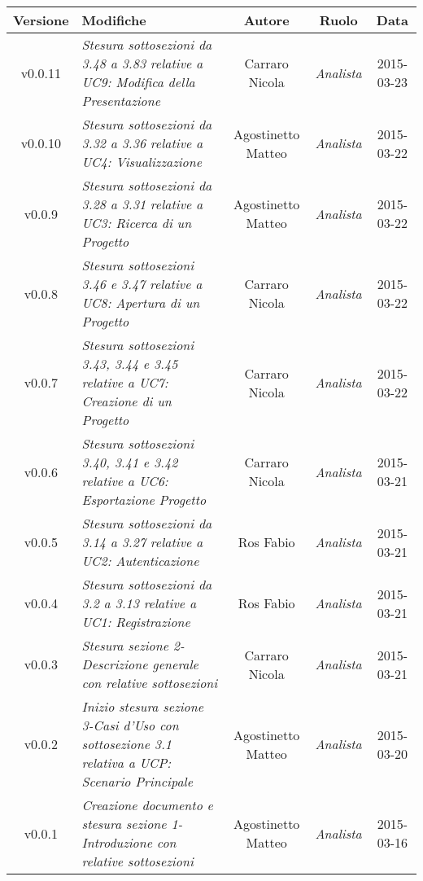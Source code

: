 \newpage
\begin{table}[h]
\centering
\begin{tabular}{|c|p{}|c|c|c|}
	\toprule
		\textbf{Versione} & \textbf{Modifiche} & \textbf{Autore} & \textbf{Ruolo} & \textbf{Data}\\
	\midrule
	\midrule
		v0.0.11 & \textit{Stesura sottosezioni da 3.48 a 3.83 relative a UC9: Modifica della Presentazione} & Carraro Nicola & \textit{Analista} & 2015-03-23\\
	\midrule
		v0.0.10 & \textit{Stesura sottosezioni da 3.32 a 3.36 relative a UC4: Visualizzazione} & Agostinetto Matteo & \textit{Analista} & 2015-03-22\\
	\midrule
		v0.0.9 & \textit{Stesura sottosezioni da 3.28 a 3.31 relative a UC3: Ricerca di un Progetto} & Agostinetto Matteo & \textit{Analista} & 2015-03-22\\
	\midrule
		v0.0.8 & \textit{Stesura sottosezioni 3.46 e 3.47 relative a UC8: Apertura di un Progetto} & Carraro Nicola & \textit{Analista} & 2015-03-22\\
	\midrule
		v0.0.7 & \textit{Stesura sottosezioni 3.43, 3.44 e 3.45 relative a UC7: Creazione di un Progetto} & Carraro Nicola & \textit{Analista} & 2015-03-22\\
	\midrule
		v0.0.6 & \textit{Stesura sottosezioni 3.40, 3.41 e 3.42 relative a UC6: Esportazione Progetto} & Carraro Nicola & \textit{Analista} & 2015-03-21\\
	\midrule
		v0.0.5 & \textit{Stesura sottosezioni da 3.14 a 3.27 relative a UC2: Autenticazione} & Ros Fabio & \textit{Analista} & 2015-03-21\\
	\midrule
		v0.0.4 & \textit{Stesura sottosezioni da 3.2 a 3.13 relative a UC1: Registrazione} & Ros Fabio & \textit{Analista} & 2015-03-21\\
	\midrule
		v0.0.3 & \textit{Stesura sezione 2-Descrizione generale con relative sottosezioni} & Carraro Nicola & \textit{Analista} & 2015-03-21\\
	\midrule
		v0.0.2 & \textit{Inizio stesura sezione 3-Casi d'Uso con sottosezione 3.1 relativa a UCP: Scenario Principale} & Agostinetto Matteo & \textit{Analista} & 2015-03-20\\
	\midrule
		v0.0.1 & \textit{Creazione documento e stesura sezione 1-Introduzione con relative sottosezioni} & Agostinetto Matteo & \textit{Analista} & 2015-03-16\\
	\bottomrule
\end{tabular}
\end{table}
\newpage
